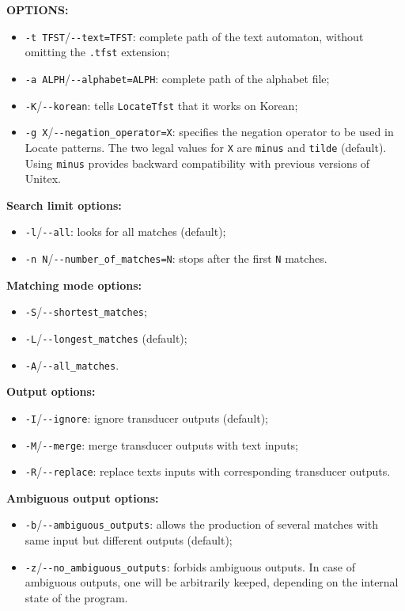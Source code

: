 \bigskip
\noindent \textbf{OPTIONS:}
\begin{itemize}
  \item \verb+-t TFST+/\verb+--text=TFST+: complete path of the text automaton,
  without omitting the \verb+.tfst+ extension;

  \item \verb+-a ALPH+/\verb+--alphabet=ALPH+: complete path of the alphabet
  file;
  
  \item \verb+-K+/\verb+--korean+: tells \verb+LocateTfst+ that it works on
  Korean;

  \item \verb+-g X+/\verb+--negation_operator=X+: specifies the negation operator to be used in
  Locate patterns. The two legal values for \verb+X+ are \verb+minus+ and \verb+tilde+ (default).
  Using \verb+minus+ provides backward compatibility with previous versions of Unitex.
  
\end{itemize}

\bigskip
\noindent \textbf{Search limit options:}
\begin{itemize}
  \item \verb+-l+/\verb+--all+: looks for all matches (default);
  \item \verb+-n N+/\verb+--number_of_matches=N+: stops after the first
  \verb+N+ matches.
\end{itemize}

\bigskip
\noindent \textbf{Matching mode options:}
\begin{itemize}
  \item \verb+-S+/\verb+--shortest_matches+;
  \item \verb+-L+/\verb+--longest_matches+ (default);
  \item \verb+-A+/\verb+--all_matches+.
\end{itemize}

\bigskip
\noindent \textbf{Output options:}
\begin{itemize}
  \item \verb+-I+/\verb+--ignore+: ignore transducer outputs (default);
  \item \verb+-M+/\verb+--merge+: merge transducer outputs with text inputs;
  \item \verb+-R+/\verb+--replace+: replace texts inputs with corresponding
  transducer outputs.
\end{itemize}

\bigskip
\noindent \textbf{Ambiguous output options:}
\begin{itemize}
  \item \verb+-b+/\verb+--ambiguous_outputs+: allows the production of several 
  matches with same input but different outputs (default);
  \item \verb+-z+/\verb+--no_ambiguous_outputs+: forbids ambiguous outputs. In
  case of ambiguous outputs, one will be arbitrarily keeped, depending on the
  internal state of the program.
\end{itemize}

